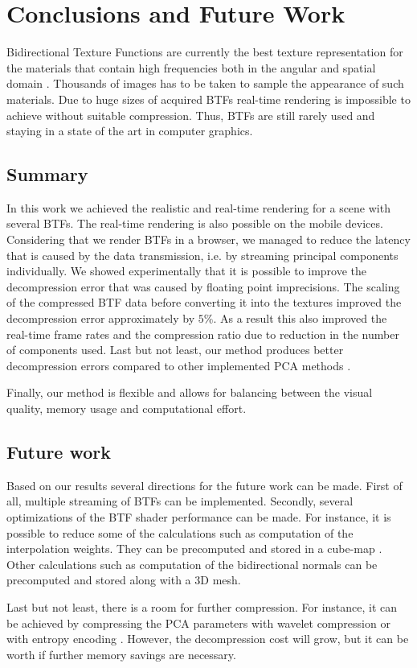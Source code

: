 \chapter{Conclusions and Future Work}
\label{chapter:conclusions}
 Bidirectional Texture Functions are currently the best texture representation for the materials 
 that contain high frequencies both in the angular and spatial domain \cite{mueller-2003-compression}.
 Thousands of images has to be taken to sample the appearance of such materials.
 Due to huge sizes of acquired BTFs real-time rendering is impossible to achieve without suitable compression.
 Thus, BTFs are still rarely used and staying in a state of the art in computer graphics. 

\section{Summary}

 In this work we achieved the realistic and real-time rendering for a scene with several BTFs.
The real-time rendering is also possible on the mobile devices.
 Considering that we render BTFs in a browser, we managed to reduce the latency that is caused by the data transmission, i.e.
 by streaming  principal components individually.
 We showed experimentally that it is possible to improve the decompression error that was caused by floating point imprecisions.
 The scaling of the compressed BTF data before converting it into the textures improved the decompression error approximately by $5\%$.
 As a result this also improved the real-time frame rates and the compression ratio due to reduction in the number of components used.
 Last but not least, our method produces better decompression errors compared to other implemented PCA methods \cite{haindl}.


Finally, our method is flexible and allows for balancing between the visual quality, memory usage and computational effort.
\section{Future work}
\label{section:future_work}

Based on our results several directions for the future work can be made.
First of all, multiple streaming of BTFs can be implemented.
Secondly, several optimizations of the BTF shader performance can be made.
For instance, it is possible to reduce some of the calculations such as computation of the interpolation weights. 
They can be precomputed and stored in a cube-map \cite{haindl}.
Other calculations such as computation of the bidirectional normals can be precomputed and stored along with a 3D mesh.

Last but not least, there is a room for further compression.
 For instance, it can be achieved by compressing the PCA parameters with wavelet compression \cite{webglbtfstreaming} or with entropy encoding \cite{gpu_gems}. 
However, the decompression cost will grow, but it can be worth if further memory savings are necessary. 